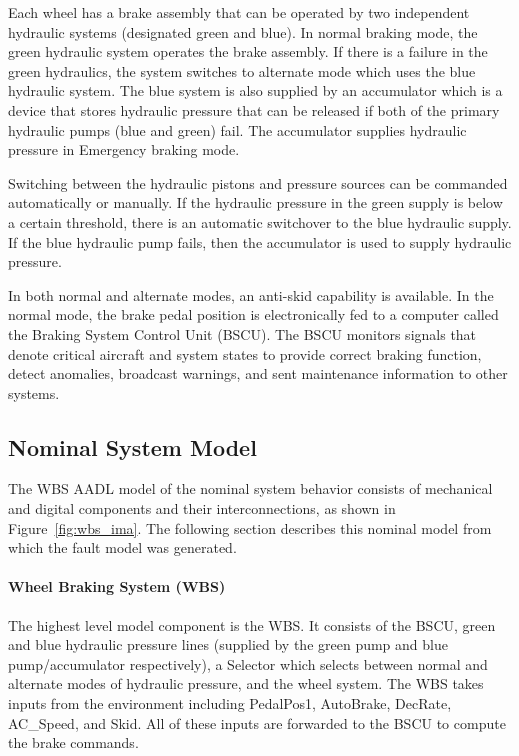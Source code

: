 Each wheel has a brake assembly that can be operated by two independent hydraulic systems (designated green and blue). In normal braking mode, the green hydraulic system operates the brake assembly.  If there is a failure in the green hydraulics, the system switches to alternate mode which uses the blue hydraulic system.  The blue system is also supplied by an accumulator which is a device that stores hydraulic pressure that can be released if both of the primary hydraulic pumps (blue and green) fail. The accumulator supplies hydraulic pressure in Emergency braking mode.

Switching between the hydraulic pistons and pressure sources can be commanded automatically or manually. If the hydraulic pressure in the green supply is below a certain threshold, there is an automatic switchover to the blue hydraulic supply. If the blue hydraulic pump fails, then the accumulator is used to supply hydraulic pressure.

In both normal and alternate modes, an anti-skid capability is available. In the normal mode, the brake pedal position is electronically fed to a computer called the Braking System Control Unit (BSCU). The BSCU monitors signals that denote critical aircraft and system states to provide correct braking function, detect anomalies, broadcast warnings, and sent maintenance information to other systems.

\subsection{Nominal System Model}
\label{sec:nominal}
The WBS AADL model of the nominal system behavior consists of mechanical and digital components and their interconnections, as shown in Figure~\ref{fig:wbs_ima}. The following section describes this nominal model from which the fault model was generated.

\paragraph{Wheel Braking System (WBS)}
The highest level model component is the WBS. It consists of the BSCU, green and blue hydraulic pressure lines (supplied by the green pump  and blue pump/accumulator respectively), a Selector which selects between normal and alternate modes of hydraulic pressure, and the wheel system. The WBS takes inputs from the environment including PedalPos1, AutoBrake, DecRate, AC\_Speed, and Skid. All of these inputs are forwarded to the BSCU to compute the brake commands.

